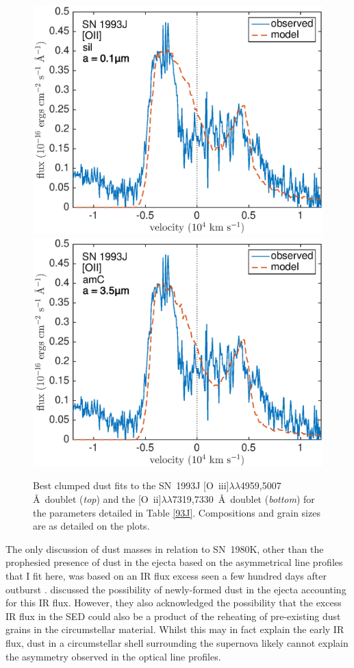 \begin{figure}
\includegraphics[scale=0.4,clip=true, trim=0 0 40 20]{chapters/chapter6/figs/93J/clumped/OII_sil}
\includegraphics[scale=0.4,clip=true, trim=30 0 40 20]{chapters/chapter6/figs/93J/clumped/OII_amC}
\caption{Best clumped dust fits to the SN~1993J [O~{\sc iii}]$\lambda\lambda$4959,5007 \AA\ doublet ({\em top}) and the [O~{\sc ii}]$\lambda\lambda$7319,7330~\AA\ doublet  ({\em bottom}) for the parameters detailed in Table \ref{93J}.  Compositions and grain sizes are as detailed on the plots.}
\label{93J_clumped}
\end{figure}

The only discussion of dust masses in relation to SN~1980K, other than the prophesied presence of dust in the ejecta based on the asymmetrical line profiles that I fit here, was based on an IR flux excess seen a few hundred days after outburst \citep{Dwek1983}.  \citet{Dwek1983} discussed the possibility of newly-formed dust in the ejecta accounting for this IR flux. However, they also acknowledged the possibility that the excess IR flux in the SED could also be a product of the reheating of pre-existing dust grains in the circumstellar material.  Whilst this may in fact explain the early IR flux,  dust in a circumstellar shell surrounding the supernova likely cannot explain the asymmetry observed in the optical line profiles.

